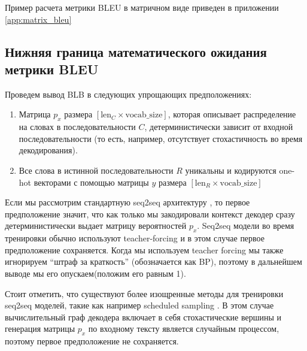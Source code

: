 \documentclass[14pt, a4paper]{extarticle}
\begin{document}
Пример расчета метрики BLEU в матричном виде приведен в приложении \ref{app:matrix_bleu}

\subsection{Нижняя граница математического ожидания метрики BLEU}
Проведем вывод BLB в следующих упрощающих предположениях:

\begin{enumerate}
  \item Матрица $p_x$ размера $[\textrm{len}_C \times \textrm{vocab\_size}]$,
  которая описывает распределение на словах в последовательности $C$, детерминистически зависит от входной последовательности
  (то есть, например, отсутствует стохастичность во время декодирования).
  \item Все слова в истинной последовательности $R$ уникальны и кодируются one-hot
  векторами с помощью матрицы $y$ размера $[\textrm{len}_R \times \textrm{vocab\_size}]$
\end{enumerate}

Если мы рассмотрим стандартную seq2seq архитектуру \cite{seq2seq}, то первое предположение значит, что как только мы закодировали контекст декодер сразу детерминистически выдает матрицу вероятностей $p_x$.
Seq2seq модели во время тренировки обычно используют teacher-forcing \cite{teacher_forcing} и в этом случае первое предположение сохраняется.
Когда мы используем teacher forcing мы также игнорируем ``штраф за краткость'' (обозначается как BP), поэтому в дальнейшем выводе мы его опускаем(положим его равным 1).

Стоит отметить, что существуют более изощренные методы для тренировки seq2seq моделей, такие как например scheduled sampling \cite{scheduled_sampling}.
В этом случае вычислительный граф декодера включает в себя стохастические вершины \cite{scg_seq2seq} и генерация матрицы $p_x$ по входному тексту является случайным процессом, поэтому первое предположение не сохраняется.

\end{document}
